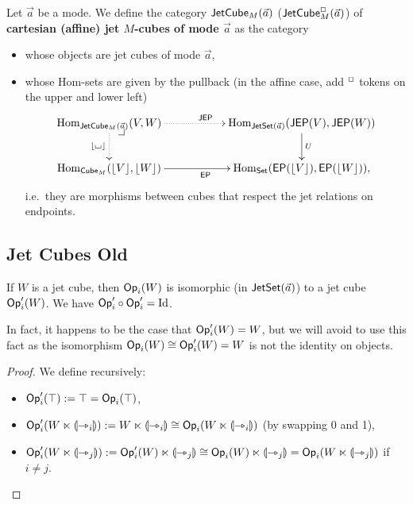 \documentclass[a4paper]{article}
\begin{document}
\begin{definition} \label{def:jet-cube-cat}
	Let $\vec a$ be a mode.
	We define the category $\mathsf{JetCube}_{M}\mathopen{}\left( \vec a \right)\mathclose{}$ ($\mathsf{JetCube}^\Box_{M}\mathopen{}\left( \vec a \right)\mathclose{}$) of \textbf{cartesian (affine) jet $M$-cubes of mode $\vec a$} as the category
	\begin{itemize}
		\item whose objects are jet cubes of mode $\vec a$,
		\item whose Hom-sets are given by the pullback (in the affine case, add ${}^\Box$ tokens on the upper and lower left)
		\begin{equation}
			\xymatrix{
				\Hom_{\jetcubecart{M}{\vec a}}(V, W)
					\ar@{.>}[rr]^{\JEP}
					\ar@{.>}[d]_{\erasejc{\loch}}
					\xydrcorner
				&&
				\Hom_{\jetset{\vec a}}(\JEP(V), \JEP(W))
					\ar[d]^U
				\\
				\Hom_{\cubecat_M}(\erasejc V, \erasejc W)
					\ar[rr]_{\EP}
				&&
				\Hom_{\Set}(\EP(\erasejc V), \EP(\erasejc W)),
			}
		\end{equation}
		i.e.\ they are morphisms between cubes that respect the jet relations on endpoints.
	\end{itemize}
\end{definition}

\subsection{Jet Cubes Old}

\begin{corollary} \label{thm:jet-cube-op}
	If $W$ is a jet cube, then ${\mathsf{Op}}_i(W)$ is isomorphic (in $\mathsf{JetSet}\mathopen{}\left( \vec a \right)\mathclose{}$) to a jet cube ${\mathsf{Op}}'_i(W)$.
	We have ${\mathsf{Op}}'_i \circ {\mathsf{Op}}'_i = \mathrm{Id}$.
\end{corollary}
In fact, it happens to be the case that ${\mathsf{Op}}'_i(W) = W$, but we will avoid to use this fact as the isomorphism ${\mathsf{Op}}_i(W) \cong {\mathsf{Op}}'_i(W) = W$ is not the identity on objects.
\begin{proof}
	We define recursively:
	\begin{itemize}
		\item ${\mathsf{Op}}'_i(\top) := \top = {\mathsf{Op}}_i(\top)$,
		\item ${\mathsf{Op}}'_i(W \ltimes {\llparenthesis \rightarrowtriangle_i \rrparenthesis}) := W \ltimes {\llparenthesis \rightarrowtriangle_i \rrparenthesis} \cong {\mathsf{Op}}_i(W \ltimes {\llparenthesis \rightarrowtriangle_i \rrparenthesis})$ (by swapping 0 and 1),
		\item ${\mathsf{Op}}'_i(W \ltimes {\llparenthesis \rightarrowtriangle_j \rrparenthesis}) := {\mathsf{Op}}'_i(W) \ltimes {\llparenthesis \rightarrowtriangle_j \rrparenthesis} \cong {\mathsf{Op}}_i(W) \ltimes {\llparenthesis \rightarrowtriangle_j \rrparenthesis} = {\mathsf{Op}}_i(W \ltimes {\llparenthesis \rightarrowtriangle_j \rrparenthesis})$ if $i \neq j$. \qedhere
	\end{itemize}
\end{proof}
\end{document}

